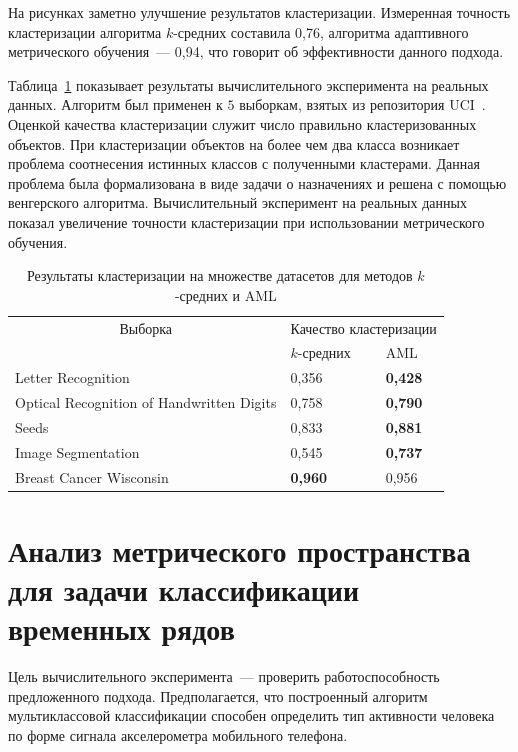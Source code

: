 На рисунках заметно улучшение результатов кластеризации.
Измеренная точность кластеризации алгоритма $k$-средних составила 0,76,
алгоритма адаптивного метрического обучения~--- 0,94, что говорит об эффективности данного подхода.

Таблица~\ref{ch5:tbl:clusteing_results} показывает результаты вычислительного эксперимента на реальных
данных.
Алгоритм был применен к $5$ выборкам, взятых из репозитория UCI~\cite{uci2017}.
Оценкой качества кластеризации служит число правильно кластеризованных объектов.
При кластеризации объектов на более чем два класса возникает проблема соотнесения истинных классов с полученными кластерами.
Данная проблема была формализована в виде задачи о назначениях и решена с помощью венгерского алгоритма. Вычислительный эксперимент на реальных данных показал увеличение точности кластеризации при использовании метрического обучения.
\begin{table}[!h]
\centering
\caption{Результаты кластеризации на множестве датасетов для методов $k$-средних и AML}
\label{ch5:tbl:clusteing_results}

\begin{tabular}{|l|l|l|}
\hline
\multicolumn{1}{|c}{Выборка}                  & \multicolumn{2}{|c|}{Качество кластеризации} \\ \cline{2-3}
                                          & $k$-средних               & AML                 \\
\hline
Letter Recognition                        & 0,356                 & \textbf{0,428}             \\
Optical Recognition of Handwritten Digits & 0,758                 & \textbf{0,790}               \\
Seeds                                     & 0,833                 & \textbf{0,881}            \\
Image Segmentation                        & 0,545                 & \textbf{0,737}            \\
Breast Cancer Wisconsin                   & \textbf{0,960}                 & 0,956               \\ \hline
\end{tabular}
\end{table}

\section{Анализ метрического пространства для задачи классификации временных рядов}
\label{sec:ch5:exp_classification}
	Цель вычислительного эксперимента~--- проверить работоспособность предложенного подхода.
	Предполагается, что построенный алгоритм мультиклассовой классификации способен определить тип активности человека по форме сигнала акселерометра мобильного телефона.
	

